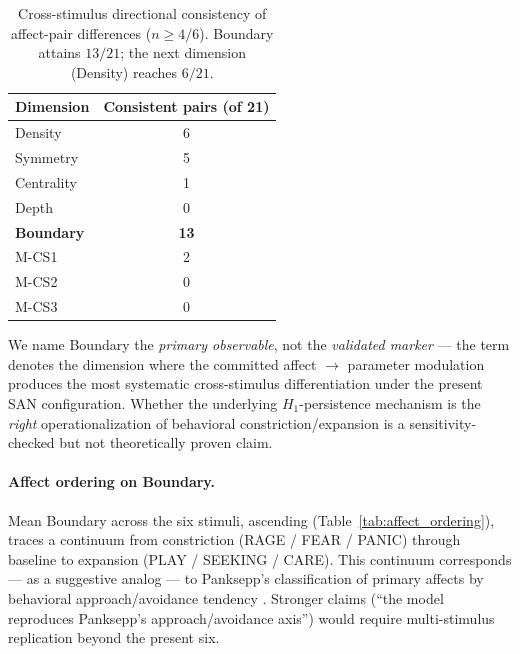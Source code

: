 \documentclass{article}
\begin{document}
\begin{table}[h]
\centering
\caption{Cross-stimulus directional consistency of affect-pair differences
($n \geq 4 / 6$). Boundary attains $13/21$; the next dimension (Density)
reaches $6/21$.}
\label{tab:affect_consistency}
\begin{tabular}{lc}
\toprule
Dimension & Consistent pairs (of 21) \\
\midrule
Density   & 6 \\
Symmetry  & 5 \\
Centrality & 1 \\
Depth     & 0 \\
\textbf{Boundary} & \textbf{13} \\
M-CS1     & 2 \\
M-CS2     & 0 \\
M-CS3     & 0 \\
\bottomrule
\end{tabular}
\end{table}

We name Boundary the \emph{primary observable}, not the
\emph{validated marker} --- the term denotes the dimension where the
committed affect $\to$ parameter modulation produces the most systematic
cross-stimulus differentiation under the present SAN configuration. Whether
the underlying $H_1$-persistence mechanism is the \emph{right}
operationalization of behavioral constriction/expansion is a sensitivity-
checked but not theoretically proven claim.

\paragraph{Affect ordering on Boundary.}
Mean Boundary across the six stimuli, ascending
(Table~\ref{tab:affect_ordering}), traces a continuum from constriction
(RAGE / FEAR / PANIC) through baseline to expansion
(PLAY / SEEKING / CARE). This continuum corresponds --- as a suggestive
analog --- to Panksepp's classification of primary affects by behavioral
approach/avoidance tendency \cite{panksepp2012archaeology}. Stronger claims
(``the model reproduces Panksepp's approach/avoidance axis'') would
require multi-stimulus replication beyond the present six.
\end{document}
